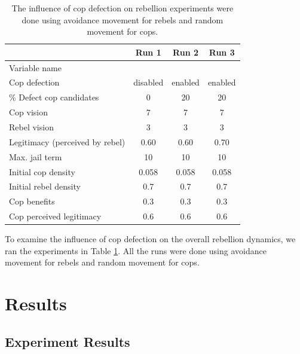 \documentclass[a4paper,11pt]{article}
\begin{document}
\begin{table}[h]
\centering
\begin{tabular}{lccc}
\cline{2-4}
 & Run 1 & Run 2 & Run 3 \\ \hline
Variable name & \multicolumn{1}{l}{} & \multicolumn{1}{l}{} & \multicolumn{1}{l}{} \\
Cop defection & disabled & enabled & enabled \\
\% Defect cop candidates & 0 & 20 & 20 \\
Cop vision & 7 & 7 & 7 \\
Rebel vision & 3 & 3 & 3 \\
Legitimacy (perceived by rebel) & 0.60 & 0.60 & 0.70 \\
Max. jail term & 10 & 10 & 10 \\
Initial cop density & 0.058 & 0.058 & 0.058\\
Initial rebel density & 0.7 & 0.7 & 0.7\\
Cop benefits & 0.3 & 0.3 & 0.3\\
Cop perceived legitimacy & 0.6 & 0.6 & 0.6\\
\end{tabular}
\caption{The influence of cop defection on rebellion experiments were done using avoidance movement for rebels and random movement for cops.}
\label{tab:copDefect}
\end{table}

To examine the influence of cop defection on the overall rebellion dynamics, we ran the experiments in Table \ref{tab:copDefect}. All the runs were done using avoidance movement for rebels and random movement for cops.

\section{Results}
\subsection{Experiment Results}
\end{document}
